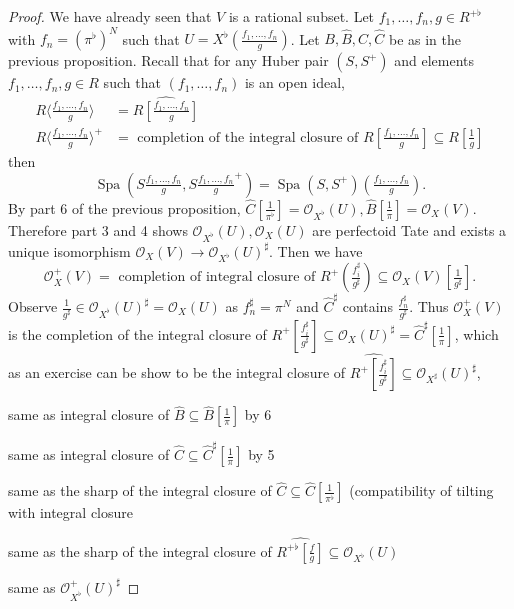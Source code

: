 \documentclass[a4paper]{article}
\newcommand{\tilt}{\flat} %
\newcommand{\sh}[1]{\mathcal{#1}} %
\DeclareMathOperator{\Spa}{Spa}
\newcommand{\sh}[1]{\mathcal{#1}} %
\DeclareMathOperator{\Spa}{Spa}
\begin{document}
\begin{proof}
  We have already seen that \(V\) is a rational subset. Let \(f_1, \dots, f_n, g \in R^{+ \tilt}\) with \(f_n = (\pi^\tilt)^N\) such that \(U = X^\tilt(\frac{f_1, \dots, f_n}{g})\). Let \(B, \widehat B, C, \hat C\) be as in the previous proposition. Recall that for any Huber pair \((S, S^+)\) and elements \(f_1, \dots, f_n, g \in R\) such that \((f_1, \dots, f_n)\) is an open ideal,
  \begin{align*}
    R\langle \tfrac{f_1, \dots, f_n}{g} \rangle &= \widehat{R[\tfrac{f_1, \dots, f_n}{g}]} \\
    R\langle \tfrac{f_1, \dots, f_n}{g} \rangle^+ &= \text{ completion of the integral closure of } R[\tfrac{f_1, \dots, f_n}{g}] \subseteq R[\tfrac{1}{g}]
  \end{align*}
  then
  \[
    \Spa(S\tfrac{f_1, \dots, f_n}{g}, S\tfrac{f_1, \dots, f_n}{g}^+) = \Spa(S, S^+)(\tfrac{f_1, \dots, f_n}{g}).
  \]
  By part 6 of the previous proposition, \(\widehat C[\frac{1}{\pi^\tilt}] = \sh O_{X^\tilt}(U), \widehat B[\frac{1}{\pi}] = \sh O_X(V)\). Therefore part 3 and 4 shows \(\sh O_{X^\tilt}(U), \sh O_X(U)\) are perfectoid Tate and exists a unique isomorphism \(\sh O_X(V) \to \sh O_{X^\tilt}(U)^\sharp\). Then we have
  \[
    \sh O_X^+(V) = \text{ completion of integral closure of } R^+(\tfrac{f_i^\sharp}{g^\sharp}) \subseteq \sh O_X(V)[\tfrac{1}{g^\sharp}].
  \]
  Observe \(\frac{1}{g^\sharp} \in \sh O_{X^\tilt}(U)^\sharp = \sh O_X(U)\) as \(f_n^\sharp = \pi^N\) and \(\widehat C^\sharp\) contains \(\frac{f_n^\sharp}{g^\sharp}\). Thus \(\sh O_X^+(V)\) is the completion of the integral closure of \(R^+[\frac{f_i^\sharp}{g^\sharp}] \subseteq \sh O_X(U)^\sharp = \widehat C^\sharp[\frac{1}{\pi}]\), which as an exercise can be show to be
  the integral closure of \(\widehat{R^+[\frac{f_i^\sharp}{g^\sharp}]} \subseteq \sh O_{X^\sharp}(U)^\sharp\),

  same as integral closure of \(\widehat B \subseteq \widehat B[\frac{1}{\pi}]\) by 6

  same as integral closure of \(\widehat C \subseteq \widehat C^\sharp[\frac{1}{\pi}]\) by 5

  same as the sharp of the integral closure of \(\widehat C \subseteq \widehat C[\frac{1}{\pi^\tilt}]\) (compatibility of tilting with integral closure

  same as the sharp of the integral closure of \(\widehat{R^{+ \tilt}[\frac{f}{g}]} \subseteq \sh O_{X^\tilt}(U)\)

  same as \(\sh O_{X^\tilt}^+(U)^\sharp\)
\end{proof}
\end{document}
